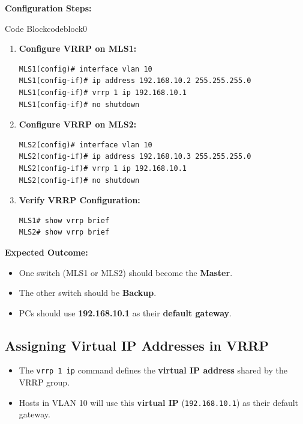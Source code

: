 \documentclass[a4paper]{book}
\begin{document}
\textbf{Configuration Steps:}

\vspace{1.5em}


\begin{ocg}{Code Block}{codeblock}{0}

\vspace{0.5cm}
\begin{enumerate}
\item \textbf{Configure VRRP on MLS1:}
\begin{lstlisting}
MLS1(config)# interface vlan 10
MLS1(config-if)# ip address 192.168.10.2 255.255.255.0
MLS1(config-if)# vrrp 1 ip 192.168.10.1
MLS1(config-if)# no shutdown
\end{lstlisting}

\item \textbf{Configure VRRP on MLS2:}
\begin{lstlisting}
MLS2(config)# interface vlan 10
MLS2(config-if)# ip address 192.168.10.3 255.255.255.0
MLS2(config-if)# vrrp 1 ip 192.168.10.1
MLS2(config-if)# no shutdown
\end{lstlisting}

\item \textbf{Verify VRRP Configuration:}
\begin{lstlisting}
MLS1# show vrrp brief
MLS2# show vrrp brief
\end{lstlisting}
\end{enumerate}
\end{ocg}


\textbf{Expected Outcome:}
\begin{itemize}
\item One switch (MLS1 or MLS2) should become the \textbf{Master}.
\item The other switch should be \textbf{Backup}.
\item PCs should use \textbf{192.168.10.1} as their \textbf{default gateway}.
\end{itemize}

\subsection{Assigning Virtual IP Addresses in VRRP}
\begin{itemize}
\item The \texttt{vrrp 1 ip} command defines the \textbf{virtual IP address} shared by the VRRP group.
\item Hosts in VLAN 10 will use this \textbf{virtual IP} (\texttt{192.168.10.1}) as their 
default gateway.
\end{itemize}
\end{document}
